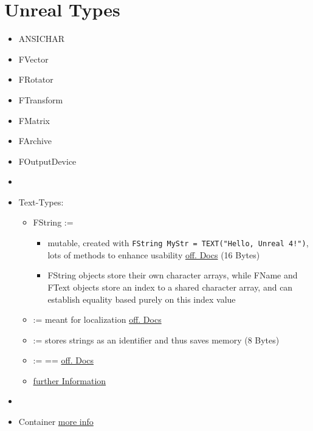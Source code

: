     \section{Unreal Types}
        \begin{itemize}
            \item ANSICHAR
            \item FVector
            \item FRotator
            \item FTransform
            \item FMatrix
            \item FArchive
            \item FOutputDevice
            \item 
            \item Text-Types:
            \begin{itemize}
                \item FString :=
                \begin{itemize}
                    \item mutable, created with \colorbox{mygray}{\lstinline{FString MyStr = TEXT("Hello, Unreal 4!")}}, lots of methods to enhance usability \href{https://docs.unrealengine.com/en-US/API/Runtime/Core/Containers/FString}{off. Docs} (16 Bytes)
                    \item FString objects store their own character arrays, while FName and FText objects store an index to a shared character array, and can establish equality based purely on this index value
                \end{itemize} 
                \item {} := meant for localization \href{https://docs.unrealengine.com/en-US/API/Runtime/Core/Internationalization/FText}{off. Docs}
                \item {} := stores strings as an identifier and thus saves memory (8 Bytes)
                \item {} := == \href{https://docs.unrealengine.com/en-US/API/Runtime/Core/Misc/TChar}{off. Docs}
                \item \href{https://docs.unrealengine.com/4.27/en-US/ProgrammingAndScripting/ProgrammingWithCPP/UnrealArchitecture/StringHandling/}{further Information}
            \end{itemize}
            \item 
            \item Container \href{https://www.unrealengine.com/en-US/blog/ue4-libraries-you-should-know-about}{more info}

\end{itemize}
